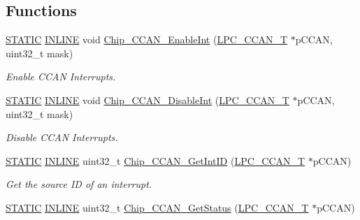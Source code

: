 \subsection*{Functions}
\begin{DoxyCompactItemize}
\item 
\hyperlink{group___l_p_c___types___public___macros_ga10b2d890d871e1489bb02b7e70d9bdfb}{S\+T\+A\+T\+IC} \hyperlink{spifi__18xx__43xx_8h_a2eb6f9e0395b47b8d5e3eeae4fe0c116}{I\+N\+L\+I\+NE} void \hyperlink{group___c_c_a_n__18_x_x__43_x_x_ga06bb34ff1e211fa5153a7f699b9ba599}{Chip\+\_\+\+C\+C\+A\+N\+\_\+\+Enable\+Int} (\hyperlink{struct_l_p_c___c_c_a_n___t}{L\+P\+C\+\_\+\+C\+C\+A\+N\+\_\+T} $\ast$p\+C\+C\+AN, uint32\+\_\+t mask)
\begin{DoxyCompactList}\small\item\em Enable C\+C\+AN Interrupts. \end{DoxyCompactList}\item 
\hyperlink{group___l_p_c___types___public___macros_ga10b2d890d871e1489bb02b7e70d9bdfb}{S\+T\+A\+T\+IC} \hyperlink{spifi__18xx__43xx_8h_a2eb6f9e0395b47b8d5e3eeae4fe0c116}{I\+N\+L\+I\+NE} void \hyperlink{group___c_c_a_n__18_x_x__43_x_x_gaf4667bd6b992eabb841d91e9b6a753be}{Chip\+\_\+\+C\+C\+A\+N\+\_\+\+Disable\+Int} (\hyperlink{struct_l_p_c___c_c_a_n___t}{L\+P\+C\+\_\+\+C\+C\+A\+N\+\_\+T} $\ast$p\+C\+C\+AN, uint32\+\_\+t mask)
\begin{DoxyCompactList}\small\item\em Disable C\+C\+AN Interrupts. \end{DoxyCompactList}\item 
\hyperlink{group___l_p_c___types___public___macros_ga10b2d890d871e1489bb02b7e70d9bdfb}{S\+T\+A\+T\+IC} \hyperlink{spifi__18xx__43xx_8h_a2eb6f9e0395b47b8d5e3eeae4fe0c116}{I\+N\+L\+I\+NE} uint32\+\_\+t \hyperlink{group___c_c_a_n__18_x_x__43_x_x_ga0f994d17cbfb6859384c4f4896a23156}{Chip\+\_\+\+C\+C\+A\+N\+\_\+\+Get\+Int\+ID} (\hyperlink{struct_l_p_c___c_c_a_n___t}{L\+P\+C\+\_\+\+C\+C\+A\+N\+\_\+T} $\ast$p\+C\+C\+AN)
\begin{DoxyCompactList}\small\item\em Get the source ID of an interrupt. \end{DoxyCompactList}\item 
\hyperlink{group___l_p_c___types___public___macros_ga10b2d890d871e1489bb02b7e70d9bdfb}{S\+T\+A\+T\+IC} \hyperlink{spifi__18xx__43xx_8h_a2eb6f9e0395b47b8d5e3eeae4fe0c116}{I\+N\+L\+I\+NE} uint32\+\_\+t \hyperlink{group___c_c_a_n__18_x_x__43_x_x_gac5ea5e28fefe41244766c8cd9b8dce6d}{Chip\+\_\+\+C\+C\+A\+N\+\_\+\+Get\+Status} (\hyperlink{struct_l_p_c___c_c_a_n___t}{L\+P\+C\+\_\+\+C\+C\+A\+N\+\_\+T} $\ast$p\+C\+C\+AN)

\end{DoxyCompactItemize}
